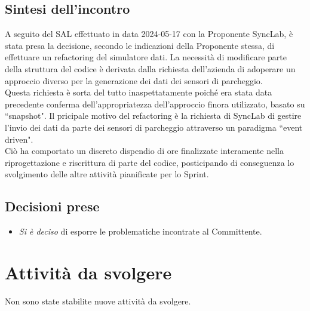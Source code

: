 \documentclass[8pt]{article}
\begin{document}
\subsection{Sintesi dell'incontro}
A seguito del SAL effettuato in data 2024-05-17 con la Proponente SyncLab, è stata presa la decisione, secondo le indicazioni della Proponente stessa, di effettuare un refactoring del simulatore dati. 
La necessità di modificare parte della struttura del codice è derivata dalla richiesta dell'azienda di adoperare un approccio diverso per la generazione dei dati dei sensori di parcheggio.\\
Questa richiesta è sorta del tutto inaspettatamente poiché era stata data precedente conferma dell'appropriatezza dell'approccio finora utilizzato, basato su ``snapshot". Il pricipale motivo del refactoring è la richiesta di SyncLab di gestire l'invio dei dati da parte dei sensori di parcheggio attraverso un paradigma ``event driven".\\
Ciò ha comportato un discreto dispendio di ore finalizzate interamente nella riprogettazione e riscrittura di parte del codice, posticipando di conseguenza lo svolgimento delle altre attività pianificate per lo Sprint.
\subsection{Decisioni prese}
\begin{itemize}
	\setlength\itemsep{0em}
	\item \textit{Si è deciso} di esporre le problematiche incontrate al Committente.
\end{itemize}
\section{Attività da svolgere}
Non sono state stabilite nuove attività da svolgere.
\end{document}
